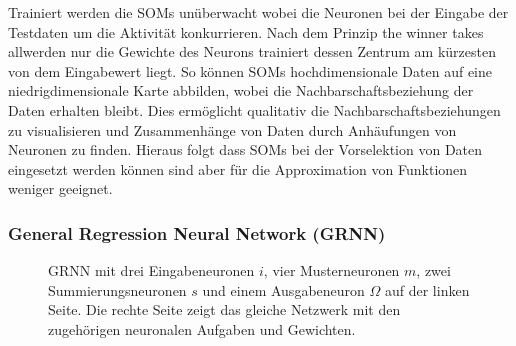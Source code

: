 Trainiert werden die SOMs unüberwacht wobei die Neuronen bei der Eingabe der Testdaten um die Aktivität konkurrieren. Nach dem Prinzip \glqq the winner takes all\grqq werden nur die Gewichte des Neurons trainiert dessen Zentrum am kürzesten von dem Eingabewert liegt.
So können SOMs hochdimensionale Daten auf eine niedrigdimensionale Karte abbilden, wobei die Nachbarschaftsbeziehung der Daten erhalten bleibt. Dies ermöglicht qualitativ die Nachbarschaftsbeziehungen zu visualisieren und Zusammenhänge von Daten durch Anhäufungen von Neuronen zu finden. Hieraus folgt dass SOMs bei der Vorselektion von Daten eingesetzt werden können sind aber für die Approximation von Funktionen weniger geeignet.

\subsubsection{General Regression Neural Network (GRNN)}
\begin{figure}[!htb]
    \centering
        
    \caption{GRNN mit drei Eingabeneuronen $i$, vier Musterneuronen $m$, zwei Summierungsneuronen $s$ und einem Ausgabeneuron $\Omega$  auf der linken Seite. Die rechte Seite zeigt das gleiche Netzwerk mit den zugehörigen neuronalen Aufgaben und Gewichten.}
    \label{fig:GRNN}
\end{figure}

